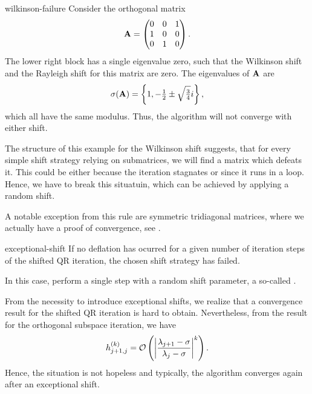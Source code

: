 \begin{Example}{wilkinson-failure}
  Consider the orthogonal matrix
  \begin{gather}
    \mata =
    \begin{pmatrix}
      0&0&1\\1&0&0\\0&1&0
    \end{pmatrix}.
  \end{gather}
  The lower right block has a single eigenvalue zero, such that the
  Wilkinson shift and the Rayleigh shift for this matrix are zero. The eigenvalues of $\mata$ are
  \begin{gather}
    \sigma(\mata) = \left\{1, -\tfrac12 \pm \sqrt{\tfrac34}i\right\},
  \end{gather}
  which all have the same modulus. Thus, the algorithm will not converge with either shift.
\end{Example}

\begin{remark}
  The structure of this example for the Wilkinson shift suggests, that
  for every simple shift strategy relying on submatrices, we will find
  a matrix which defeats it. This could be either because the
  iteration stagnates or since it runs in a loop. Hence, we have to
  break this situatuin, which can be achieved by applying a random
  shift.

  A notable exception from this rule are symmetric tridiagonal
  matrices, where we actually have a proof of convergence, see
  .
\end{remark}

\begin{Algorithm}{exceptional-shift}
  If no deflation has ocurred for a given number of iteration steps of
  the shifted QR iteration, the chosen shift strategy has failed.

  In this case, perform a single step with a random shift parameter, a
  so-called .
\end{Algorithm}

\begin{remark}
  From the necessity to introduce exceptional shifts, we realize that
  a convergence result for the shifted QR iteration is hard to
  obtain. Nevertheless, from the result for the orthogonal subspace
  iteration, we have
  \begin{gather}
    h_{j+1,j}^{(k)} = \bigo \left(\abs*{\frac{\lambda_{j+1}-\sigma}{\lambda_j-\sigma}}^k\right).
  \end{gather}
  Hence, the situation is not hopeless and typically, the algorithm
  converges again after an exceptional shift.
\end{remark}

